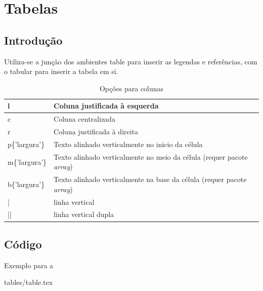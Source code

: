\section{Tabelas} %
\label{sec:tabelas}

\subsection*{Introdução} %

\begin{frame}[fragile]
	
Utiliza-se a junção dos ambientes {\ttfamily table} para inserir as legendas e referências, com o {\ttfamily tabular} para inserir a tabela em si.

\begin{table}[htbp]
\caption{Opções para colunas}\centering\code
\begin{tabular}{|l|p{5cm}|}
\hline
l & Coluna justificada à esquerda \\ \hline
c & Coluna centralizada \\ \hline
r & Coluna justificada à direita \\ \hline
p\{'largura'\} & Texto alinhado verticalmente no inicio da célula \\ \hline
m\{'largura'\} & Texto alinhado verticalmente no meio da célula (requer pacote {\it array}) \\ \hline
b\{'largura'\} & Texto alinhado verticalmente na base da célula (requer pacote {\it array}) \\ \hline
| & linha vertical \\ \hline
|| & linha vertical dupla \\ \hline
\end{tabular}
\end{table}

\end{frame}


\subsection*{Código} %
\label{sub:c_digo}

\begin{frame}{Exemplo para a }

 {tables/table.tex}

\end{frame}

